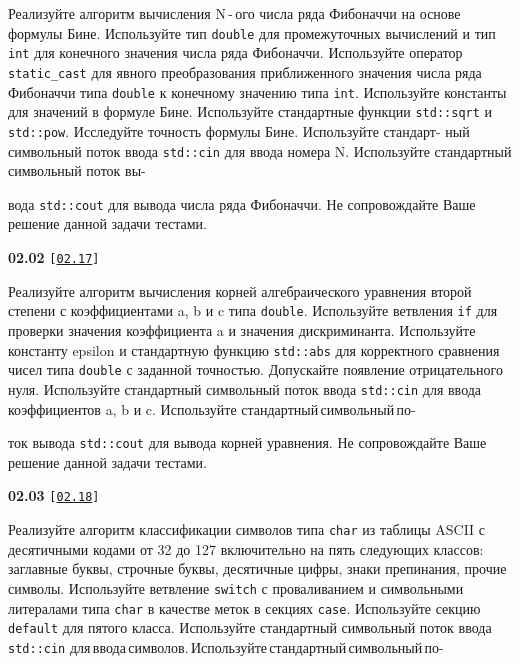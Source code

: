 \documentclass[a4paper,12pt]{article}
\begin{document}
\bigskip

Реализуйте алгоритм вычисления N\,-\,ого числа ряда Фибоначчи на основе формулы Бине. Используйте тип \lstinline{double} для промежуточных вычислений и тип \lstinline{int} для конечного значения числа ряда Фибоначчи. Используйте оператор \lstinline{static_cast} для явного преобразования приближенного значения числа ряда Фибоначчи типа \lstinline{double} к конечному значению типа \lstinline{int}. Используйте константы для значений в формуле Бине. Используйте стандартные функции \lstinline{std::sqrt} и \lstinline{std::pow}. Исследуйте точность формулы Бине. Используйте стандарт- ный символьный поток ввода \lstinline{std::cin} для ввода номера N. Используйте стандартный символьный поток вы- 

вода \lstinline{std::cout} для вывода числа ряда Фибоначчи. Не сопровождайте Ваше решение данной задачи тестами.

\bigskip

{\large \textbf{02.02} \texttt{[\href{https://github.com/i-s-m-mipt/Education/blob/master/projects/examples/source/02.17.cpp}{\texttt{02.17}}]}}

\bigskip

Реализуйте алгоритм вычисления корней алгебраического уравнения второй степени с коэффициентами a, b и c типа \lstinline{double}. Используйте ветвления \lstinline{if} для проверки значения коэффициента a и значения дискриминанта. Используйте константу epsilon и стандартную функцию \lstinline{std::abs} для корректного сравнения чисел типа \lstinline{double} с заданной точностью. Допускайте появление отрицательного нуля. Используйте стандартный символьный поток ввода \lstinline{std::cin} для ввода коэффициентов a, b и c. Используйте стандартный\,символьный\,по- 

ток вывода \lstinline{std::cout} для вывода корней уравнения. Не сопровождайте Ваше решение данной задачи тестами.

\bigskip

{\large \textbf{02.03} \texttt{[\href{https://github.com/i-s-m-mipt/Education/blob/master/projects/examples/source/02.18.cpp}{\texttt{02.18}}]}}

\bigskip

Реализуйте алгоритм классификации символов типа \lstinline{char} из таблицы ASCII с десятичными кодами от 32 до 127 включительно на пять следующих классов: заглавные буквы, строчные буквы, десятичные цифры, знаки препинания, прочие символы. Используйте ветвление \lstinline{switch} с проваливанием и символьными литералами типа \lstinline{char} в качестве меток в секциях \lstinline{case}. Используйте секцию \lstinline{default} для пятого класса. Используйте стандартный символьный поток ввода \lstinline{std::cin} для\,ввода\,символов.\,Используйте\,стандартный\,символьный\,по- 
\end{document}
